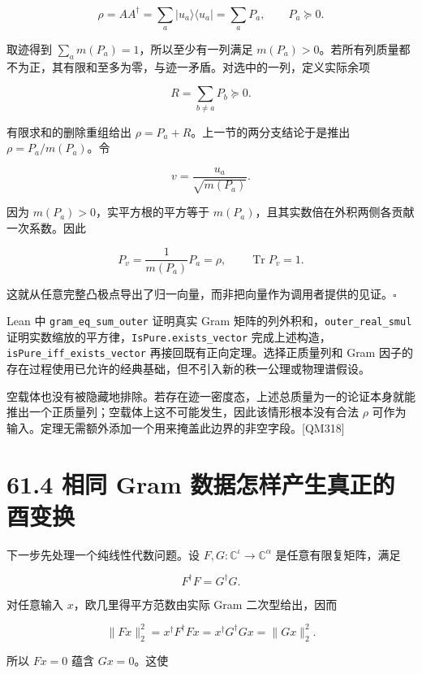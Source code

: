 \documentclass[
  11pt,
  oneside]{book}
\begin{document}
\[
\rho=AA^\dagger=\sum_a |u_a\rangle\langle u_a|
=\sum_a P_a,\qquad P_a\succeq0.
\]

取迹得到 \(\sum_a m(P_a)=1\)，所以至少有一列满足
\(m(P_a)>0\)。若所有列质量都不为正，其有限和至多为零，与迹一矛盾。对选中的一列，定义实际余项

\[
R=\sum_{b\ne a}P_b\succeq0.
\]

有限求和的删除重组给出 \(\rho=P_a+R\)。上一节的两分支结论于是推出
\(\rho=P_a/m(P_a)\)。令

\[
v=\frac{u_a}{\sqrt{m(P_a)}}.
\]

因为 \(m(P_a)>0\)，实平方根的平方等于
\(m(P_a)\)，且其实数倍在外积两侧各贡献一次系数。因此

\[
P_v=\frac1{m(P_a)}P_a=\rho,
\qquad\operatorname{Tr}P_v=1.
\]

这就从任意完整凸极点导出了归一向量，而非把向量作为调用者提供的见证。\(\square\)

Lean 中 \texttt{gram\_\allowbreak eq\_\allowbreak sum\_\allowbreak outer} 证明真实 Gram
矩阵的列外积和，\texttt{outer\_\allowbreak real\_\allowbreak smul}
证明实数缩放的平方律，\texttt{IsPure.exists\_\allowbreak vector}
完成上述构造，\texttt{isPure\_\allowbreak iff\_\allowbreak exists\_\allowbreak vector}
再接回既有正向定理。选择正质量列和 Gram
因子的存在过程使用已允许的经典基础，但不引入新的秩一公理或物理谱假设。

空载体也没有被隐藏地排除。若存在迹一密度态，上述总质量为一的论证本身就能推出一个正质量列；空载体上这不可能发生，因此该情形根本没有合法
\(\rho\)
可作为输入。定理无需额外添加一个用来掩盖此边界的非空字段。{[}QM318{]}

\hypertarget{ux76f8ux540c-gram-ux6570ux636eux600eux6837ux4ea7ux751fux771fux6b63ux7684ux9149ux53d8ux6362}{%
\section{61.4 相同 Gram
数据怎样产生真正的酉变换}\label{ux76f8ux540c-gram-ux6570ux636eux600eux6837ux4ea7ux751fux771fux6b63ux7684ux9149ux53d8ux6362}}

下一步先处理一个纯线性代数问题。设
\(F,G:\mathbb C^{\iota}\to\mathbb C^{\alpha}\) 是任意有限复矩阵，满足

\[
F^\dagger F=G^\dagger G.
\]

对任意输入 \(x\)，欧几里得平方范数由实际 Gram 二次型给出，因而

\[
\|Fx\|_2^2=x^\dagger F^\dagger Fx
=x^\dagger G^\dagger Gx=\|Gx\|_2^2.
\]

所以 \(Fx=0\) 蕴含 \(Gx=0\)。这使
\end{document}
